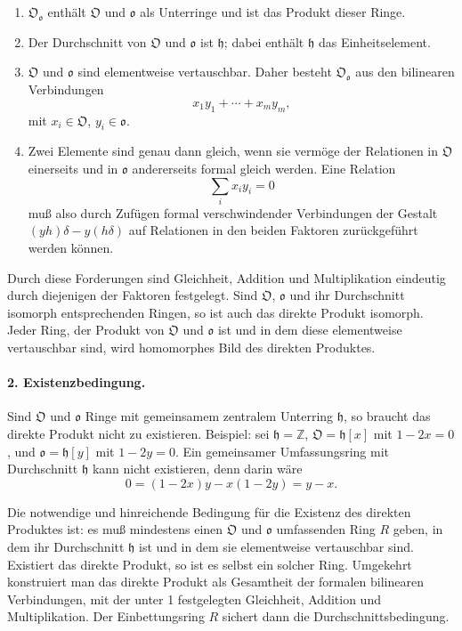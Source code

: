 \documentclass[11pt]{article}
\begin{document}
\begin{enumerate}
\item $\mathfrak O_{\mathfrak o}$ enthält $\mathfrak O$ und $\mathfrak o$ als Unterringe und ist das Produkt dieser Ringe.
\item Der Durchschnitt von $\mathfrak O$ und $\mathfrak o$ ist $\mathfrak h$; dabei enthält $\mathfrak h$ das Einheitselement.
\item $\mathfrak O$ und $\mathfrak o$ sind elementweise vertauschbar. Daher besteht $\mathfrak O_{\mathfrak o}$ aus den bilinearen Verbindungen
\[
        x_1y_1+\cdots+x_my_m,
\]
mit $x_i\in\mathfrak O$, $y_i\in\mathfrak o$.
\item Zwei Elemente sind genau dann gleich, wenn sie vermöge der Relationen in $\mathfrak O$ einerseits und in $\mathfrak o$ andererseits formal gleich werden. Eine Relation
\[
        \sum_i x_i y_i=0
\]
muß also durch Zufügen formal verschwindender Verbindungen der Gestalt $(yh)\delta-y(h\delta)$ auf Relationen in den beiden Faktoren zurückgeführt werden können.
\end{enumerate}

Durch diese Forderungen sind Gleichheit, Addition und Multiplikation eindeutig durch diejenigen der Faktoren festgelegt. Sind $\mathfrak O$, $\mathfrak o$ und ihr Durchschnitt isomorph entsprechenden Ringen, so ist auch das direkte Produkt isomorph. Jeder Ring, der Produkt von $\mathfrak O$ und $\mathfrak o$ ist und in dem diese elementweise vertauschbar sind, wird homomorphes Bild des direkten Produktes.

\paragraph{2. Existenzbedingung.}
Sind $\mathfrak O$ und $\mathfrak o$ Ringe mit gemeinsamem zentralem Unterring $\mathfrak h$, so braucht das direkte Produkt nicht zu existieren. Beispiel: sei $\mathfrak h=\mathbb Z$, $\mathfrak O=\mathfrak h[x]$ mit $1-2x=0$, und $\mathfrak o=\mathfrak h[y]$ mit $1-2y=0$. Ein gemeinsamer Umfassungsring mit Durchschnitt $\mathfrak h$ kann nicht existieren, denn darin wäre
\[
        0=(1-2x)y-x(1-2y)=y-x.
\]

Die notwendige und hinreichende Bedingung für die Existenz des direkten Produktes ist: es muß mindestens einen $\mathfrak O$ und $\mathfrak o$ umfassenden Ring $R$ geben, in dem ihr Durchschnitt $\mathfrak h$ ist und in dem sie elementweise vertauschbar sind. Existiert das direkte Produkt, so ist es selbst ein solcher Ring. Umgekehrt konstruiert man das direkte Produkt als Gesamtheit der formalen bilinearen Verbindungen, mit der unter 1 festgelegten Gleichheit, Addition und Multiplikation. Der Einbettungsring $R$ sichert dann die Durchschnittsbedingung.
\end{document}
